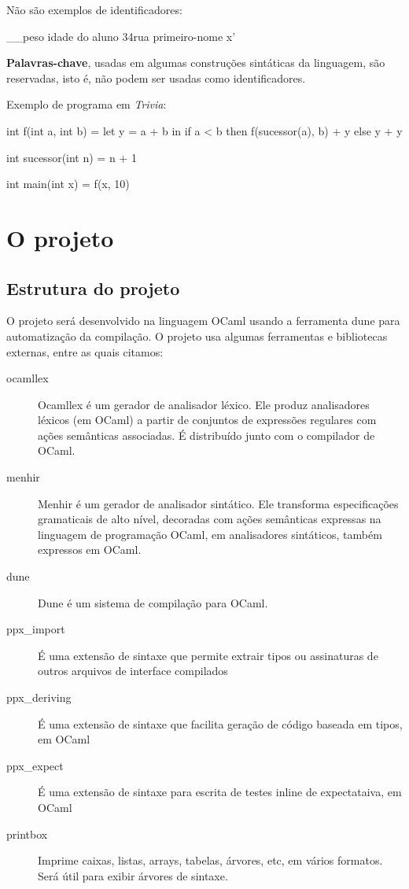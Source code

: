 \documentclass[a4paper,11pt,brazil]{article}
\newcommand{\lang}{\textsl{Trivia}}
\begin{document}
Não são exemplos de identificadores:
\begin{pygmented}[lang=text]
__peso
idade do aluno
34rua
primeiro-nome
x'
\end{pygmented}

\textbf{Palavras-chave}, usadas em algumas construções sintáticas da
linguagem, são reservadas, isto é, não podem ser usadas como
identificadores.

Exemplo de programa em \lang{}:
\begin{pygmented}[lang=text]
int f(int a, int b) =
  let y = a + b
  in
    if a < b then
      f(sucessor(a), b) + y
    else
      y + y

int sucessor(int n) =
  n + 1

int main(int x) =
  f(x, 10)
\end{pygmented}

\section{O projeto}

\subsection{Estrutura do projeto}

O projeto será desenvolvido na linguagem OCaml usando a ferramenta
dune para automatização da compilação. O projeto usa algumas
ferramentas e bibliotecas externas, entre as quais citamos:
\begin{description}
  \item[ocamllex] Ocamllex é um gerador de analisador léxico. Ele
  produz analisadores léxicos (em OCaml) a partir de conjuntos de
  expressões regulares com ações semânticas associadas. É distribuído
  junto com o compilador de OCaml.
  
  \item[menhir] Menhir é um gerador de analisador sintático. Ele
  transforma especificações gramaticais de alto nível, decoradas com
  ações semânticas expressas na linguagem de programação OCaml, em
  analisadores sintáticos, também expressos em OCaml.

  \item[dune] Dune é um sistema de compilação para OCaml.

  \item[ppx_import] É uma extensão de sintaxe que permite extrair
  tipos ou assinaturas de outros arquivos de interface compilados

  \item[ppx_deriving] É uma extensão de sintaxe que facilita geração
  de código baseada em tipos, em OCaml

  \item[ppx_expect] É uma extensão de sintaxe para escrita de testes
  inline de expectataiva, em OCaml

  \item[printbox] Imprime caixas, listas, arrays, tabelas, árvores,
  etc, em vários formatos. Será útil para exibir árvores de sintaxe.
\end{description}
  
\end{document}
